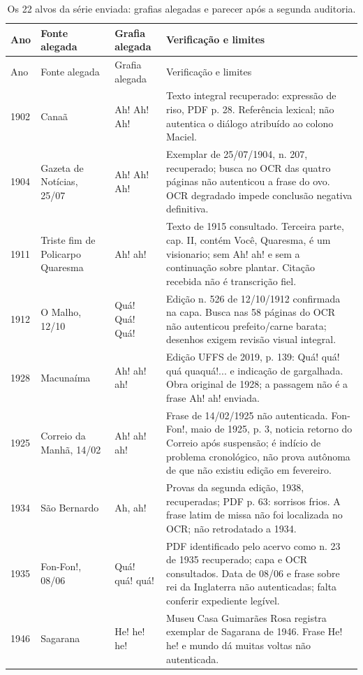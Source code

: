 \small\begin{longtable}{p{}p{}p{}p{}}
\caption{Os 22 alvos da série enviada: grafias alegadas e parecer após a segunda auditoria.}\\
\toprule Ano & Fonte alegada & Grafia alegada & Verificação e limites \\\midrule\endfirsthead
\toprule Ano & Fonte alegada & Grafia alegada & Verificação e limites \\\midrule\endhead
1902 & Canaã & Ah! Ah! Ah! & Texto integral recuperado: expressão de riso, PDF p. 28. Referência lexical; não autentica o diálogo atribuído ao colono Maciel. \\
1904 & Gazeta de Notícias, 25/07 & Ah! Ah! Ah! & Exemplar de 25/07/1904, n. 207, recuperado; busca no OCR das quatro páginas não autenticou a frase do ovo. OCR degradado impede conclusão negativa definitiva. \\
1911 & Triste fim de Policarpo Quaresma & Ah! ah! & Texto de 1915 consultado. Terceira parte, cap. II, contém Você, Quaresma, é um visionario; sem Ah! ah! e sem a continuação sobre plantar. Citação recebida não é transcrição fiel. \\
1912 & O Malho, 12/10 & Quá! Quá! Quá! & Edição n. 526 de 12/10/1912 confirmada na capa. Busca nas 58 páginas do OCR não autenticou prefeito/carne barata; desenhos exigem revisão visual integral. \\
1928 & Macunaíma & Ah! ah! ah! & Edição UFFS de 2019, p. 139: Quá! quá! quá quaquá!... e indicação de gargalhada. Obra original de 1928; a passagem não é a frase Ah! ah! enviada. \\
1925 & Correio da Manhã, 14/02 & Ah! ah! ah! & Frase de 14/02/1925 não autenticada. Fon-Fon!, maio de 1925, p. 3, noticia retorno do Correio após suspensão; é indício de problema cronológico, não prova autônoma de que não existiu edição em fevereiro. \\
1934 & São Bernardo & Ah, ah! & Provas da segunda edição, 1938, recuperadas; PDF p. 63: sorrisos frios. A frase latim de missa não foi localizada no OCR; não retrodatado a 1934. \\
1935 & Fon-Fon!, 08/06 & Quá! quá! quá! & PDF identificado pelo acervo como n. 23 de 1935 recuperado; capa e OCR consultados. Data de 08/06 e frase sobre rei da Inglaterra não autenticadas; falta conferir expediente legível. \\
1946 & Sagarana & He! he! he! & Museu Casa Guimarães Rosa registra exemplar de Sagarana de 1946. Frase He! he! e mundo dá muitas voltas não autenticada. \\

\end{longtable}
